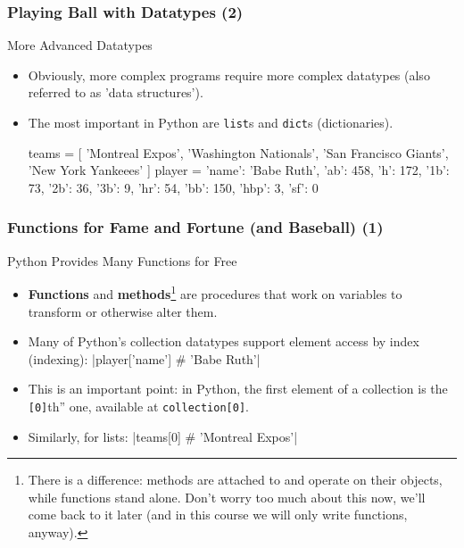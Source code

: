 \documentclass[10pt]{beamer}
\begin{document}
\begin{frame}[fragile]
  \frametitle{Playing Ball with Datatypes (2)}
  \begin{block}{More Advanced Datatypes}
    \begin{itemize}
      \item Obviously, more complex programs require more complex datatypes (also referred to as 'data structures').
      \item The most important in Python are \texttt{list}s and \texttt{dict}s (dictionaries).
        \begin{pythoncode}
  teams = [
    'Montreal Expos', 'Washington Nationals',
    'San Francisco Giants', 'New York Yankeees'
  ]
  player = {
    'name': 'Babe Ruth', 'ab': 458, 'h': 172,
    '1b': 73, '2b': 36, '3b': 9, 'hr': 54,
    'bb': 150, 'hbp': 3, 'sf': 0
  }
        \end{pythoncode}
    \end{itemize}
  \end{block}
\end{frame}

\begin{frame}[fragile]
  \frametitle{Functions for Fame and Fortune (and Baseball) (1)}
  \begin{block}{Python Provides Many Functions for Free}
    \begin{itemize}
      \item \textbf{Functions} and \textbf{methods}\footnote{There is a difference: methods are attached to and operate on their objects, while functions stand alone. Don't worry too much about this now, we'll come back to it later (and in this course we will only write functions, anyway).} are procedures that work on variables to transform or otherwise alter them.
      \item Many of Python's collection datatypes support element access by index (indexing):
        |player['name'] # 'Babe Ruth'|

      \item This is an important point: in Python, the first element of a collection is the \texttt{[0]}th'' one, available at \texttt{collection[0]}.
      \item Similarly, for lists:
        |teams[0] # 'Montreal Expos'|
    \end{itemize}
  \end{block}
\end{frame}
\end{document}
